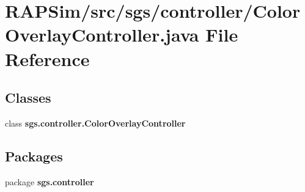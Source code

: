 \section{R\-A\-P\-Sim/src/sgs/controller/\-Color\-Overlay\-Controller.java File Reference}
\label{_color_overlay_controller_8java}
\subsection*{Classes}
\begin{DoxyCompactItemize}
\item 
class {\bf sgs.\-controller.\-Color\-Overlay\-Controller}
\end{DoxyCompactItemize}
\subsection*{Packages}
\begin{DoxyCompactItemize}
\item 
package {\bf sgs.\-controller}
\end{DoxyCompactItemize}
